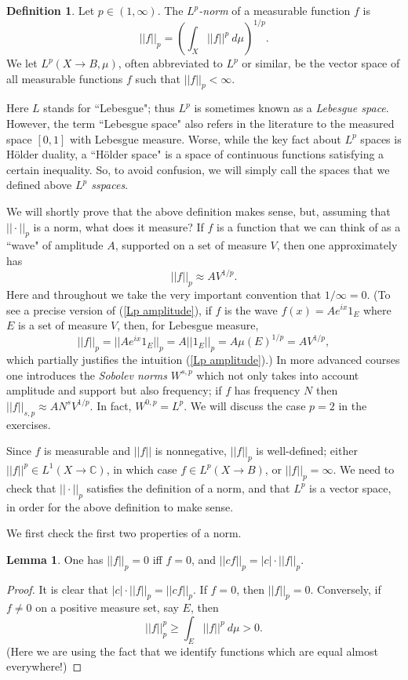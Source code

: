 \documentclass[12pt]{book}
\newcommand{\CC}{\mathbb{C}}
\newcommand{\dfn}[1]{\emph{#1}\index{#1}}
\theoremstyle{definition}
\newtheorem{lemma}[theorem]{Lemma}
\newtheorem{definition}[theorem]{Definition}
\begin{document}
\begin{definition}
Let $p \in (1, \infty)$.
The \dfn{$L^p$-norm} of a measurable function $f$ is
\begin{equation}
\label{Lp definition}
||f||_p = \left(\int_X ||f||^p ~d\mu\right)^{1/p}.
\end{equation}
We let $L^p(X \to B, \mu)$, often abbreviated to $L^p$ or similar, be the vector space of all measurable functions $f$ such that $||f||_p < \infty$.
\end{definition}

Here $L$ stands for ``Lebesgue"; thus $L^p$ is sometimes known as a \dfn{Lebesgue space}.
However, the term ``Lebesgue space" also refers in the literature to the measured space $[0, 1]$ with Lebesgue measure.
Worse, while the key fact about $L^p$ spaces is H\"older duality, a ``H\"older space" is a space of continuous functions satisfying a certain inequality.
So, to avoid confusion, we will simply call the spaces that we defined above \dfn{$L^p$ sspaces}.

We will shortly prove that the above definition makes sense, but, assuming that $||\cdot||_p$ is a norm, what does it measure?
If $f$ is a function that we can think of as a ``wave" of amplitude $A$, supported on a set of measure $V$, then one approximately has
\begin{equation}
\label{Lp amplitude}
||f||_p \approx AV^{1/p}.
\end{equation}
Here and throughout we take the very important convention that $1/\infty = 0$.
(To see a precise version of (\ref{Lp amplitude}), if $f$ is the wave $f(x) = Ae^{ix}1_E$ where $E$ is a set of measure $V$, then, for Lebesgue measure,
$$||f||_p = ||Ae^{ix}1_E||_p = A ||1_E||_p = A\mu(E)^{1/p} = AV^{1/p},$$
which partially justifies the intuition (\ref{Lp amplitude}).)
In more advanced courses one introduces the \dfn{Sobolev norms} $W^{s,p}$ which not only takes into account amplitude and support but also frequency; if $f$ has frequency $N$ then $||f||_{s,p} \approx AN^sV^{1/p}$.
In fact, $W^{0,p} = L^p$.
We will discuss the case $p = 2$ in the exercises.

Since $f$ is measurable and $||f||$ is nonnegative, $||f||_p$ is well-defined; either $||f||^p \in L^1(X \to \CC)$, in which case $f \in L^p(X \to B)$, or $||f||_p = \infty$.
We need to check that $||\cdot||_p$ satisfies the definition of a norm, and that $L^p$ is a vector space, in order for the above definition to make sense.

We first check the first two properties of a norm.
\begin{lemma}
One has $||f||_p = 0$ iff $f = 0$, and $||cf||_p = |c|\cdot||f||_p$.
\end{lemma}
\begin{proof}
It is clear that $|c|\cdot||f||_p = ||cf||_p$.
If $f = 0$, then $||f||_p = 0$.
Conversely, if $f \neq 0$ on a positive measure set, say $E$, then
$$||f||_p^p \geq \int_E ||f||^p ~d\mu > 0.$$
(Here we are using the fact that we identify functions which are equal almost everywhere!)
\end{proof}
\end{document}

